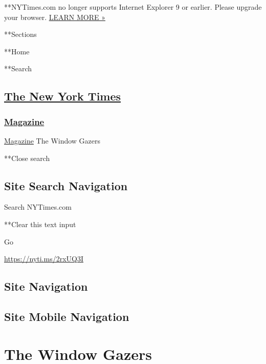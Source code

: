  **NYTimes.com no longer supports Internet Explorer 9 or earlier. Please
upgrade your browser.
\href{http://www.nytimes3xbfgragh.onion/content/help/site/ie9-support.html}{LEARN
MORE »}

**Sections

**Home

**Search

\hypertarget{the-new-york-times}{%
\subsection{\texorpdfstring{\href{http://www.nytimes3xbfgragh.onion/}{The
New York Times}}{The New York Times}}\label{the-new-york-times}}

\hypertarget{-magazine-}{%
\subsubsection{\texorpdfstring{
\href{https://www.nytimes3xbfgragh.onion/section/magazine}{Magazine}
}{ Magazine }}\label{-magazine-}}

 \href{https://www.nytimes3xbfgragh.onion/section/magazine}{Magazine}
\textbar{}The Window Gazers

**Close search

\hypertarget{site-search-navigation}{%
\subsection{Site Search Navigation}\label{site-search-navigation}}

Search NYTimes.com

**Clear this text input

Go

\url{https://nyti.ms/2rxUQ3I}

\hypertarget{site-navigation}{%
\subsection{Site Navigation}\label{site-navigation}}

\hypertarget{site-mobile-navigation}{%
\subsection{Site Mobile Navigation}\label{site-mobile-navigation}}

\hypertarget{the-window-gazers}{%
\section{The Window Gazers}\label{the-window-gazers}}

